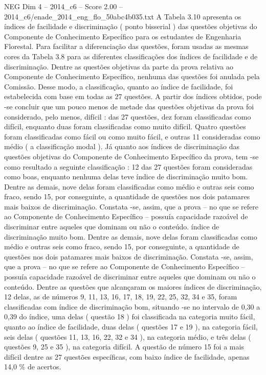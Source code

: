 \begin{textsample}{NEG Dim 4 – 2014\_c6 – Score 2.00 – 2014\_c6/enade\_2014\_eng\_flo\_50abc4b035.txt}
A Tabela 3.10 apresenta os índices de facilidade e discriminação ( ponto bisserial ) das questões objetivas do Componente de Conhecimento Específico para os estudantes de Engenharia Florestal.
Para facilitar a diferenciação das questões, foram usadas as mesmas cores da Tabela 3.8 para as diferentes classificações dos índices de facilidade e de discriminação.
Dentre as questões objetivas da parte da prova relativa ao Componente de Conhecimento Específico, nenhuma das questões foi anulada pela Comissão.
Desse modo, a classificação, quanto ao índice de facilidade, foi estabelecida com base em todas as 27 questões.
A partir dos índices obtidos, pode -se concluir que um pouco menos de metade das questões objetivas da prova foi considerado, pelo menos, difícil : das 27 questões, dez foram classificadas como difícil, enquanto duas foram classificadas como muito difícil.
Quatro questões foram classificadas como fácil ou como muito fácil, e outras 11 consideradas como médio ( a classificação modal ).
Já quanto aos índices de discriminação das questões objetivas do Componente de Conhecimento Específico da prova, tem -se como resultado a seguinte classificação : 12 das 27 questões foram consideradas como boas, enquanto nenhuma delas teve índice de discriminação muito bom.
Dentre as demais, nove delas foram classificadas como médio e outras seis como fraco, sendo 15, por conseguinte, a quantidade de questões nos dois patamares mais baixos de discriminação.
Constata -se, assim, que a prova – no que se refere ao Componente de Conhecimento Específico – possuía capacidade razoável de discriminar entre aqueles que dominam ou não o conteúdo. índice de discriminação muito bom.
Dentre as demais, nove delas foram classificadas como médio e outras seis como fraco, sendo 15, por conseguinte, a quantidade de questões nos dois patamares mais baixos de discriminação.
Constata -se, assim, que a prova – no que se refere ao Componente de Conhecimento Específico – possuía capacidade razoável de discriminar entre aqueles que dominam ou não o conteúdo.
Dentre as questões que alcançaram os maiores índices de discriminação, 12 delas, as de números 9, 11, 13, 16, 17, 18, 19, 22, 25, 32, 34 e 35, foram classificadas com índice de discriminação bom, situando -se no intervalo de 0,30 a 0,39 do índice, uma delas ( questão 18 ) foi classificada na categoria muito fácil, quanto ao índice de facilidade, duas delas ( questões 17 e 19 ), na categoria fácil, seis delas ( questões 11, 13, 16, 22, 32 e 34 ), na categoria médio, e três delas ( questões 9, 25 e 35 ), na categoria difícil.
A questão de número 15 foi a mais difícil dentre as 27 questões específicas, com baixo índice de facilidade, apenas 14,0 \% de acertos.

\end{textsample}
